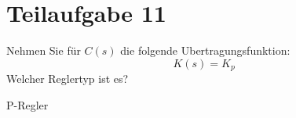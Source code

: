 \section{Teilaufgabe 11}
\begin{aufgabe}
Nehmen Sie für $C(s)$ die folgende Ubertragungsfunktion: 
\[ K(s) = K_p \]
Welcher Reglertyp ist es?
\end{aufgabe}
P-Regler
